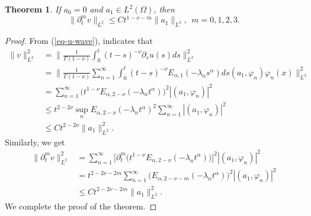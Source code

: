 \documentclass[11pt]{article}
\newtheorem{theorem}{Theorem}
\numberwithin{equation}{section}
\begin{document}
\begin{theorem}\label{thm-reg-L2-v}
If $a_0=0$ and $a_1\in L^2(\Omega)$, then
\[
\|\partial_t^mv\|_{L^2}\le Ct^{1-\nu-m}\|a_1\|_{L^2},~~m=0,1,2,3.
\]
\end{theorem}
\begin{proof}
From (\ref{eq-u-wave}), indicates that
\begin{align*}
\|v\|_{L^2}^2
& = \bigg\|\frac{1}{\Gamma{(1-\nu)}}\int_0^t(t-s)^{-\nu}\partial_su(s)ds\bigg\|_{L^2}^2\\
& = \bigg\|\frac{1}{\Gamma{(1-\nu)}}\sum_{n=1}^{\infty}  \int_0^t(t-s)^{-\nu}E_{\alpha,1}(-\lambda_n s^\alpha)ds(a_1, \varphi_n) \varphi_n(x)\bigg\|_{L^2}^2\\
& = \sum_{n=1}^{\infty}\big(t^{1-\nu}E_{\alpha,2-\nu}(-\lambda_n t^\alpha)\big)^2|(a_1, \varphi_n)|^2 \\
&\le t^{2-2\nu}\sup_nE_{\alpha,2-\nu}(-\lambda_n t^\alpha)^2\sum_{n=1}^{\infty}|(a_1, \varphi_n)|^2\\
&\le Ct^{2-2\nu}\|a_1\|_{L^2}^2.
\end{align*}
Similarly, we get
\begin{align*}
\|\partial_t^mv\|_{L^2}^2
& = \sum_{n=1}^{\infty}\big[\partial_t^m\big(t^{1-\nu}E_{\alpha,2-\nu}(-\lambda_n t^\alpha)\big)\big]^2|(a_1, \varphi_n)|^2\\
& = t^{2-2\nu-2m}\sum_{n=1}^{\infty}\big(E_{\alpha,2-\nu-m}(-\lambda_n t^\alpha)\big)^2|(a_1, \varphi_n)|^2\\
&\le Ct^{2-2\nu-2m}\|a_1\|_{L^2}^2.
\end{align*}
We complete the proof of the theorem.
\end{proof}
\end{document}
